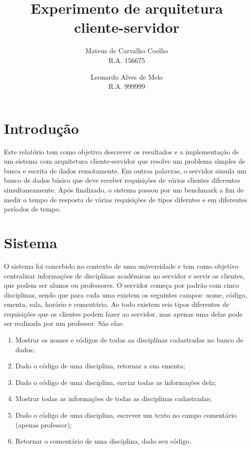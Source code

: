 \documentclass[
	article,			%
	11pt,				%
	oneside,			%
	a4paper,			%
	hidelinks,
	english,			%
	brazil,				%
	sumario=abnt-6027-2012
	]{abntex2}
\title{Experimento de arquitetura cliente-servidor}
\author{
	Mateus de Carvalho Coelho \\ R.A. 156675 \and
	Leonardo Alves de Melo \\ R.A. 999999
}
\begin{document}
\maketitle

\tableofcontents*


\section{Introdução}

Este relatório tem como objetivo descrever os resultados e a implementação de um sistema com arquitetura cliente-servidor que resolve um problema simples de busca e escrita de dados remotamente. Em outras palavras, o servidor simula um banco de dados básico que deve receber requisições de vários clientes diferentes simultaneamente. Após finalizado, o sistema passou por um benchmark a fim de medir o tempo de resposta de várias requisições de tipos diferntes e em diferentes períodos de tempo.

\section{Sistema}

O sistema foi concebido no contexto de uma universidade e tem como objetivo centralizar informações de disciplinas acadêmicas no servidor e servir os clientes, que podem ser alunos ou professores. O servidor começa  por padrão com cinco disciplinas, sendo que para cada uma existem os seguintes campos: nome, código, ementa, sala, horário e comentário. Ao todo existem seis tipos diferentes de requisições que os clientes podem fazer ao servidor, mas apenas uma delas pode ser realizada por um professor. São elas:

\begin{enumerate}
	\item Mostrar os nomes e códigos de todas aa disciplinas cadastradas no banco de dados;
	\item Dado o código de uma disciplina, retornar a sua ementa;
	\item Dado o código de uma disciplina, enviar todas as informações dela;
	\item Mostrar todas as informações de todas as disciplinas cadastradas;
	\item Dado o código de uma disciplina, escrever um texto no campo comentário (apenas professor);
	\item Retornar o comentário de uma disciplina, dado seu código.
\end{enumerate}
\end{document}

